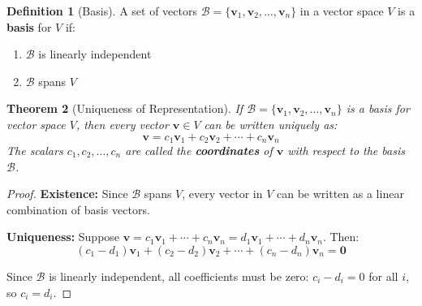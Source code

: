 \documentclass[12pt]{article}
\numberwithin{equation}{section}
\newcommand{\vect}[1]{\boldsymbol{#1}}   %
\theoremstyle{plain}
\newtheorem{theorem}{Theorem}[section]
\theoremstyle{definition}
\newtheorem{definition}[theorem]{Definition}
\theoremstyle{remark}
\begin{document}
\begin{definition}[Basis]
A set of vectors $\mathcal{B} = \{\vect{v}_1, \vect{v}_2, \ldots, \vect{v}_n\}$ in a vector space $V$ is a \textbf{basis} for $V$ if:
\begin{enumerate}
\item $\mathcal{B}$ is linearly independent
\item $\mathcal{B}$ spans $V$
\end{enumerate}
\end{definition}

\begin{theorem}[Uniqueness of Representation]
If $\mathcal{B} = \{\vect{v}_1, \vect{v}_2, \ldots, \vect{v}_n\}$ is a basis for vector space $V$, then every vector $\vect{v} \in V$ can be written uniquely as:
$$\vect{v} = c_1\vect{v}_1 + c_2\vect{v}_2 + \cdots + c_n\vect{v}_n$$
The scalars $c_1, c_2, \ldots, c_n$ are called the \textbf{coordinates} of $\vect{v}$ with respect to the basis $\mathcal{B}$.
\end{theorem}

\begin{proof}
\textbf{Existence:} Since $\mathcal{B}$ spans $V$, every vector in $V$ can be written as a linear combination of basis vectors.

\textbf{Uniqueness:} Suppose $\vect{v} = c_1\vect{v}_1 + \cdots + c_n\vect{v}_n = d_1\vect{v}_1 + \cdots + d_n\vect{v}_n$. Then:
$$(c_1 - d_1)\vect{v}_1 + (c_2 - d_2)\vect{v}_2 + \cdots + (c_n - d_n)\vect{v}_n = \vect{0}$$

Since $\mathcal{B}$ is linearly independent, all coefficients must be zero: $c_i - d_i = 0$ for all $i$, so $c_i = d_i$.
\end{proof}
\end{document}
